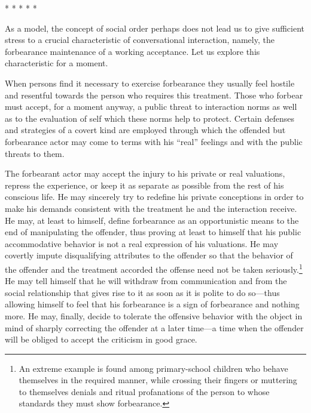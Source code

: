 \documentclass[twoside,symmetric,nobib,justified]{tufte-book}
\begin{document}
\vspace{.2in}
\begin{centering}

\Large{* * * * *}

\end{centering}
\vspace{.17in}

\noindent 

As a model, the concept of social order perhaps does not lead us to give
sufficient stress to a crucial characteristic of conversational
interaction, namely, the forbearance maintenance of a working
acceptance. Let us explore this characteristic for a moment.

When persons find it necessary to exercise forbearance they usually feel
hostile and resentful towards the person who requires this treatment.
Those who forbear must accept, for a moment anyway, a public threat to
interaction norms as well as to the evaluation of self which these norms
help to protect. Certain defenses and strategies of a covert kind are
employed through which the offended but forbearance actor may come to
terms with his ``real'' feelings and with the public threats to them.

The forbearant actor may accept the injury to his private or real
valuations, repress the experience, or keep it as separate as possible
from the rest of his conscious life. He may sincerely try to redefine
his private conceptions in order to make his demands consistent with the
treatment he and the interaction receive. He may, at least to himself,
define forbearance as an opportunistic means to the end of manipulating
the offender, thus proving at least to himself that his public
accommodative behavior is not a real expression of his valuations. He
may covertly impute disqualifying attributes to the offender so that the
behavior of the offender and the treatment accorded the offense need not
be taken seriously.\footnote{An extreme example is found among
  primary-school children who behave themselves in the required manner,
  while crossing their fingers or muttering to themselves denials and
  ritual profanations of the person to whose standards they must show
  forbearance.} He may tell himself that he will withdraw from
communication and from the social relationship that gives rise to it as
soon as it is polite to do so---thus allowing himself to feel that his
forbearance is a sign of forbearance and nothing more. He may, finally,
decide to tolerate the offensive behavior with the object in mind of
sharply correcting the offender at a later time---a time when the
offender will be obliged to accept the criticism in good grace.
\end{document}
